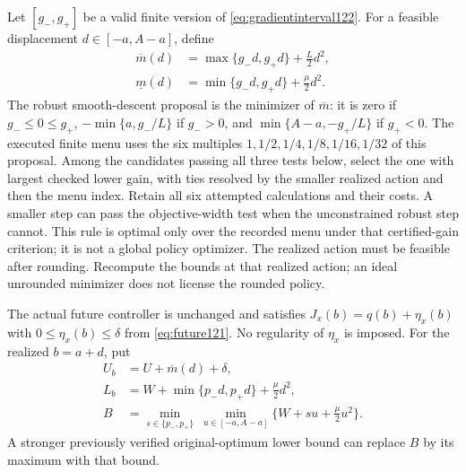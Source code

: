 Let $[g_-,g_+]$ be a valid finite version of
\eqref{eq:gradientinterval122}. For a feasible displacement
$d\in[-a,A-a]$, define
\begin{align}
 \overline m(d)&=\max\{g_-d,g_+d\}+\frac L2d^2,\label{eq:robustmodel122}\\
 \underline m(d)&=\min\{g_-d,g_+d\}+\frac\mu2d^2.\nonumber
\end{align}
The robust smooth-descent proposal is the minimizer of
$\overline m$: it is zero if $g_-\le0\le g_+$,
$-\min\{a,g_-/L\}$ if $g_->0$, and
$\min\{A-a,-g_+/L\}$ if $g_+<0$.
The executed finite menu uses the six multiples
$1,1/2,1/4,1/8,1/16,1/32$ of this proposal. Among the candidates passing all
three tests below, select the one with largest checked lower gain, with ties
resolved by the smaller realized action and then the menu index. Retain all
six attempted calculations and their costs. A smaller step can pass the
objective-width test when the unconstrained robust step cannot. This rule is
optimal only over the recorded menu under that certified-gain criterion;
it is not a global policy optimizer. The realized action must be feasible
after rounding. Recompute the
bounds at that realized action; an ideal unrounded minimizer does not
license the rounded policy.

The actual future controller is unchanged and satisfies
$J_x(b)=q(b)+\eta_x(b)$ with $0\le\eta_x(b)\le\delta$
from \eqref{eq:future121}. No regularity of $\eta_x$ is imposed.
For the realized $b=a+d$, put
\begin{align}
 U_b&=U+\overline m(d)+\delta,\nonumber\\
 L_b&=W+\min\{p_-d,p_+d\}+\frac\mu2d^2,\label{eq:candidateinterval122}\\
 B&=\min_{s\in\{p_-,p_+\}}\ 
       \min_{u\in[-a,A-a]}\{W+su+\tfrac\mu2u^2\}.
 \nonumber
\end{align}
A stronger previously verified original-optimum lower bound can replace
$B$ by its maximum with that bound.

